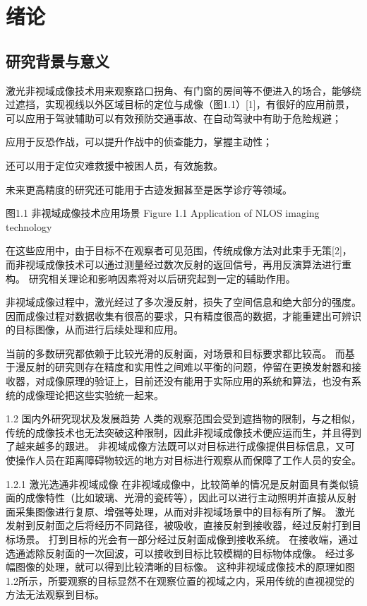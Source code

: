\chapter{绪论}\label{chap:Intro}

\section{研究背景与意义}
激光非视域成像技术用来观察路口拐角、有门窗的房间等不便进入的场合，能够绕过遮挡，实现视线以外区域目标的定位与成像（图1.1）[1]，有很好的应用前景，可以应用于驾驶辅助可以有效预防交通事故、在自动驾驶中有助于危险规避；

应用于反恐作战，可以提升作战中的侦查能力，掌握主动性；

还可以用于定位灾难救援中被困人员，有效施救。

未来更高精度的研究还可能用于古迹发掘甚至是医学诊疗等领域。

 
图1.1  非视域成像技术应用场景
Figure 1.1 Application of NLOS imaging technology

在这些应用中，由于目标不在观察者可见范围，传统成像方法对此束手无策[2]，而非视域成像技术可以通过测量经过数次反射的返回信号，再用反演算法进行重构。
研究相关理论和影响因素将对以后研究起到一定的辅助作用。

非视域成像过程中，激光经过了多次漫反射，损失了空间信息和绝大部分的强度。
因而成像过程对数据收集有很高的要求，只有精度很高的数据，才能重建出可辨识的目标图像，从而进行后续处理和应用。

当前的多数研究都依赖于比较光滑的反射面，对场景和目标要求都比较高。
而基于漫反射的研究则存在精度和实用性之间难以平衡的问题，停留在更换发射器和接收器，对成像原理的验证上，目前还没有能用于实际应用的系统和算法，也没有系统的成像理论把这些实验统一起来。

1.2  国内外研究现状及发展趋势
人类的观察范围会受到遮挡物的限制，与之相似，传统的成像技术也无法突破这种限制，因此非视域成像技术便应运而生，并且得到了越来越多的跟进。
非视域成像方法既可以对目标进行成像提供目标信息，又可使操作人员在距离障碍物较远的地方对目标进行观察从而保障了工作人员的安全。

1.2.1  激光选通非视域成像
在非视域成像中，比较简单的情况是反射面具有类似镜面的成像特性（比如玻璃、光滑的瓷砖等），因此可以进行主动照明并直接从反射面采集图像进行复原、增强等处理，从而对非视域场景中的目标有所了解。
激光发射到反射面之后将经历不同路径，被吸收，直接反射到接收器，经过反射打到目标场景。
打到目标的光会有一部分经过反射面成像到接收系统。
在接收端，通过选通滤除反射面的一次回波，可以接收到目标比较模糊的目标物体成像。
经过多幅图像的处理，就可以得到比较清晰的目标像。
这种非视域成像技术的原理如图1.2所示，所要观察的目标显然不在观察位置的视域之内，采用传统的直视视觉的方法无法观察到目标。



